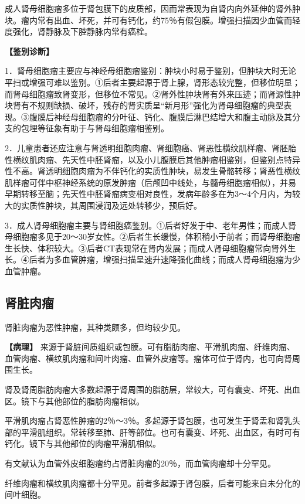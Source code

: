 成人肾母细胞瘤多位于肾包膜下的皮质部，因而常表现为自肾内向外延伸的肾外肿块。瘤内常有出血、坏死，并可有钙化，约75％有假包膜。增强扫描因少血管而轻度强化，肾静脉及下腔静脉内常有癌栓。

\textbf{【鉴别诊断】}

1．肾母细胞瘤主要应与神经母细胞瘤鉴别：肿块小时易于鉴别，但肿块大时无论平扫或增强可难以鉴别。①后者主要起源于肾上腺，肾形态较完整，但移位明显；而肾母细胞瘤致肾变形，但移位不常见。②肾外性肿块肾有外来压迹；而肾源性肿块肾有不规则缺损、破坏，残存的肾实质呈“新月形”强化为肾母细胞瘤的典型表现。③腹膜后神经母细胞瘤的分叶征、钙化、腹膜后淋巴结增大和腹主动脉及其分支的包埋等征象有助于与肾母细胞瘤相鉴别。

2．儿童患者还应注意与肾透明细胞肉瘤、肾细胞癌、肾恶性横纹肌样瘤、肾胚胎性横纹肌肉瘤、先天性中胚肾瘤，以及小儿腹膜后其他肿瘤相鉴别，但鉴别点特异性不高。肾透明细胞肉瘤为不伴钙化的实质性肿块，易发生骨骼转移；肾恶性横纹肌样瘤可伴中枢神经系统的原发肿瘤（后颅凹中线处，与髓母细胞瘤相似），并易早期转移至脑；先天性中胚肾瘤病变相对良性，发病年龄多在为3～4个月内，为较大的实质性肿块，其周围浸润及远处转移少，预后好。

3．成人肾母细胞瘤主要与肾细胞癌鉴别。①后者好发于中、老年男性；而成人肾母细胞瘤多见于20～30岁女性。②后者生长缓慢，体积稍小于前者；而肾母细胞瘤生长快、体积较大。③后者CT表现常在肾内发展；而成人肾母细胞瘤常向肾外生长。④后者为多血管肿瘤，增强扫描呈速升速降强化曲线；而成人肾母细胞瘤为少血管肿瘤。

\subsection{肾脏肉瘤}

肾脏肉瘤为恶性肿瘤，其种类颇多，但均较少见。

\textbf{【病理】}
来源于肾脏间质组织或包膜。可有脂肪肉瘤、平滑肌肉瘤、纤维肉瘤、血管肉瘤、横纹肌肉瘤和间叶肉瘤、血管外皮瘤等。瘤体可位于肾内，也可向肾周围生长。

肾及肾周脂肪肉瘤大多数起源于肾周围的脂肪层，常较大，可有囊变、坏死、出血区。镜下与其他部位的脂肪肉瘤相似。

平滑肌肉瘤占肾恶性肿瘤的2％～3％。多起源于肾包膜，也可发生于肾盂和肾乳头部的平滑肌组织。常转移至肺、肝等部位。也可有囊变、坏死、出血区，有时可有钙化。镜下与其他部位的肉瘤平滑肌相似。

有文献认为血管外皮细胞瘤约占肾脏肉瘤的20％，而血管肉瘤却十分罕见。

纤维肉瘤和横纹肌肉瘤都十分罕见。前者多起源于肾包膜，后者可能来自未分化的间叶细胞。


